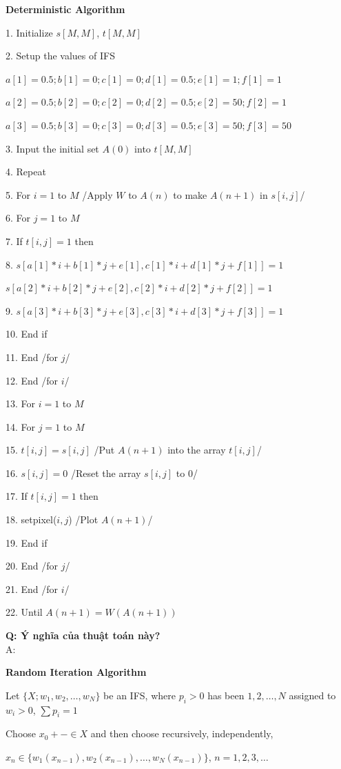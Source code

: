 \pagebreak
\textbf{Deterministic Algorithm}

1. Initialize $s[M,M]$, $t[M,M]$

2. Setup the values of IFS

$a[1]=0.5; b[1]=0; c[1]=0; d[1]=0.5; e[1]=1; f[1]=1$

$a[2]=0.5; b[2]=0; c[2]=0; d[2]=0.5; e[2]=50; f[2]=1$

$a[3]=0.5; b[3]=0; c[3]=0; d[3]=0.5; e[3]=50; f[3]=50$

3. Input the initial set $A(0)$ into $t[M,M]$

4. Repeat

5. For $i=1$ to $M$ /Apply $W$ to $A(n)$ to make $A(n+1)$ in $s[i,j]$/

6. For $j=1$ to $M$

7. If $t[i,j]=1$ then

8. $s[a[1]*i+b[1]*j+e[1], c[1]*i+d[1]*j+f[1]]=1$

$s[a[2]*i+b[2]*j+e[2], c[2]*i+d[2]*j+f[2]]=1$

9. $s[a[3]*i+b[3]*j+e[3], c[3]*i+d[3]*j+f[3]]=1$

10. End if

11. End /for $j$/

12. End /for $i$/

13. For $i=1$ to $M$

14. For $j=1$ to $M$

15. $t[i,j]=s[i,j]$ /Put $A(n+1)$ into the array $t[i,j]$/

16. $s[i,j] =0$ /Reset the array $s[i,j]$ to 0/

17. If $t[i,j]=1$ then

18. setpixel($i,j$) /Plot $A(n+1)$/

19. End if

20. End /for $j$/

21. End /for $i$/

22. Until $A(n+1)=W(A(n+1))$

\textbf{Q: Ý nghĩa của thuật toán này?}\\
A: 


\textbf{Random Iteration Algorithm}

Let $\{X; w_1, w_2, \ldots, w_N\}$ be an IFS, where $p_i > 0$ has been $1, 2, \ldots, N$ assigned to $w_i > 0$, $\sum p_i = 1$

Choose $x_0+- \in X$ and then choose recursively, independently,

$x_n \in \{ w_1(x_{n-1}), w_2(x_{n-1}), \ldots, w_N(x_{n-1}) \}$, $n = 1, 2, 3, \ldots$

